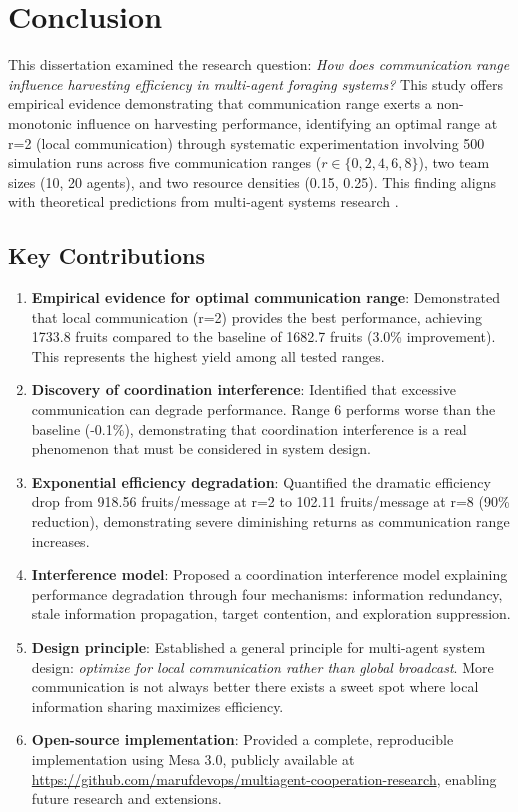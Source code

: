 \section{Conclusion}

This dissertation examined the research question: \emph{How does communication range influence harvesting efficiency in multi-agent foraging systems?} This study offers empirical evidence demonstrating that communication range exerts a non-monotonic influence on harvesting performance, identifying an optimal range at r=2 (local communication) through systematic experimentation involving 500 simulation runs across five communication ranges ($r \in \{0, 2, 4, 6, 8\}$), two team sizes (10, 20 agents), and two resource densities (0.15, 0.25). This finding aligns with theoretical predictions from multi-agent systems research \citep{wooldridge2009introduction, jennings1998roadmap}.

\subsection{Key Contributions}

\begin{enumerate}
    \item \textbf{Empirical evidence for optimal communication range}: Demonstrated that local communication (r=2) provides the best performance, achieving 1733.8 fruits compared to the baseline of 1682.7 fruits (3.0\% improvement). This represents the highest yield among all tested ranges.

    \item \textbf{Discovery of coordination interference}: Identified that excessive communication can degrade performance. Range 6 performs worse than the baseline (-0.1\%), demonstrating that coordination interference is a real phenomenon that must be considered in system design.

    \item \textbf{Exponential efficiency degradation}: Quantified the dramatic efficiency drop from 918.56 fruits/message at r=2 to 102.11 fruits/message at r=8 (90\% reduction), demonstrating severe diminishing returns as communication range increases.

    \item \textbf{Interference model}: Proposed a coordination interference model explaining performance degradation through four mechanisms: information redundancy, stale information propagation, target contention, and exploration suppression.

    \item \textbf{Design principle}: Established a general principle for multi-agent system design: \emph{optimize for local communication rather than global broadcast}. More communication is not always better there exists a sweet spot where local information sharing maximizes efficiency.

    \item \textbf{Open-source implementation}: Provided a complete, reproducible implementation using Mesa 3.0, publicly available at \url{https://github.com/marufdevops/multiagent-cooperation-research}, enabling future research and extensions.
\end{enumerate}

